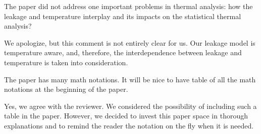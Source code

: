 \begin{reviewer}
The paper did not address one important problems in thermal analysis: how the leakage and temperature interplay and its impacts on the statistical thermal analysis?
\end{reviewer}
\begin{authors}
We apologize, but this comment is not entirely clear for us.
Our leakage model is temperature aware, and, therefore, the interdependence between leakage and temperature is taken into consideration.
\end{authors}

\begin{reviewer}
The paper has many math notations. It will be nice to have table of all the math notations at the beginning of  the paper.
\end{reviewer}
\begin{authors}
Yes, we agree with the reviewer.
We considered the possibility of including such a table in the paper.
However, we decided to invest this paper space in thorough explanations and to remind the reader the notation on the fly when it is needed.
\end{authors}

